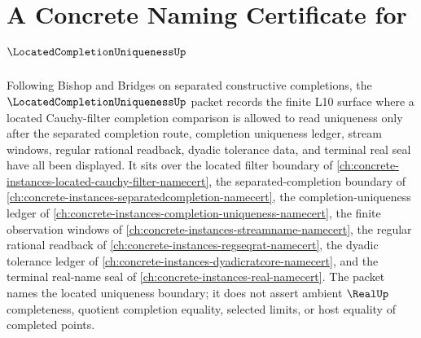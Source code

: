 \chapter{A Concrete Naming Certificate for $\LocatedCompletionUniquenessUp$}
\label{ch:concrete-instances-located-completion-uniqueness-namecert}

Following Bishop and Bridges on separated constructive completions, the $\LocatedCompletionUniquenessUp$ packet records the finite L10 surface where a located Cauchy-filter completion comparison is allowed to read uniqueness only after the separated completion route, completion uniqueness ledger, stream windows, regular rational readback, dyadic tolerance data, and terminal real seal have all been displayed. It sits over the located filter boundary of \autoref{ch:concrete-instances-located-cauchy-filter-namecert}, the separated-completion boundary of \autoref{ch:concrete-instances-separatedcompletion-namecert}, the completion-uniqueness ledger of \autoref{ch:concrete-instances-completion-uniqueness-namecert}, the finite observation windows of \autoref{ch:concrete-instances-streamname-namecert}, the regular rational readback of \autoref{ch:concrete-instances-regseqrat-namecert}, the dyadic tolerance ledger of \autoref{ch:concrete-instances-dyadicratcore-namecert}, and the terminal real-name seal of \autoref{ch:concrete-instances-real-namecert}. The packet names the located uniqueness boundary; it does not assert ambient $\RealUp$ completeness, quotient completion equality, selected limits, or host equality of completed points.

